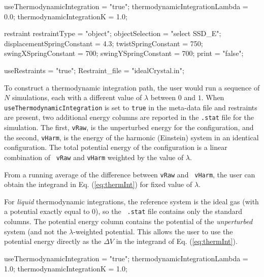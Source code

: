 \documentclass[letterpaper]{report}
\begin{document}
\begin{code}[caption={[Specifying Restraints for Thermodynamic
    Integration to an Einstein Crystal]Sample keywords defining restraints
    and their force constants for use in Thermodynamic
    Integration to an Einstein Crystal},label={sch:tiSolid}] 
useThermodynamicIntegration = "true";
thermodynamicIntegrationLambda = 0.0;
thermodynamicIntegrationK = 1.0;

restraint{
 restraintType = "object";
 objectSelection = "select SSD_E";
 displacementSpringConstant = 4.3;
 twistSpringConstant = 750;
 swingXSpringConstant = 700;
 swingYSpringConstant = 700;
 print = "false";
}

useRestraints = "true";
Restraint_file = "idealCrystal.in";
\end{code}

To construct a thermodynamic integration path, the user would run a
sequence of $N$ simulations, each with a different value of $\lambda$
between $0$ and $1$.  When {\tt useThermodynamicIntegration} is set to
{\tt true} in the meta-data file and restraints are present, two
additional energy columns are reported in the {\tt .stat} file for the
simulation.  The first, {\tt vRaw}, is the unperturbed energy for the
configuration, and the second, {\tt vHarm}, is the energy of the
harmonic (Einstein) system in an identical configuration. The total
potential energy of the configuration is a linear combination of {\tt
  vRaw} and {\tt vHarm} weighted by the value of $\lambda$.

From a running average of the difference between {\tt vRaw} and {\tt
vHarm}, the user can obtain the integrand in Eq. (\ref{eq:thermInt})
for fixed value of $\lambda$.  

For {\it liquid} thermodynamic integrations, the reference system is
the ideal gas (with a potential exactly equal to 0), so the {\tt
.stat} file contains only the standard columns. The potential energy
column contains the potential of the {\it unperturbed} system (and not
the $\lambda$-weighted potential.  This allows the user to use the 
potential energy directly as the $\Delta V$ in the integrand of
Eq. (\ref{eq:thermInt}). 

\begin{code}[caption={[Specifying Restraints for Thermodynamic
    Integration to an Ideal Gas]Sample keywords for use in Thermodynamic
    Integration to an Ideal Gas},label={sch:tiLiquid}] 
useThermodynamicIntegration = "true";
thermodynamicIntegrationLambda = 1.0;
thermodynamicIntegrationK = 1.0;
\end{code}
\end{document}
